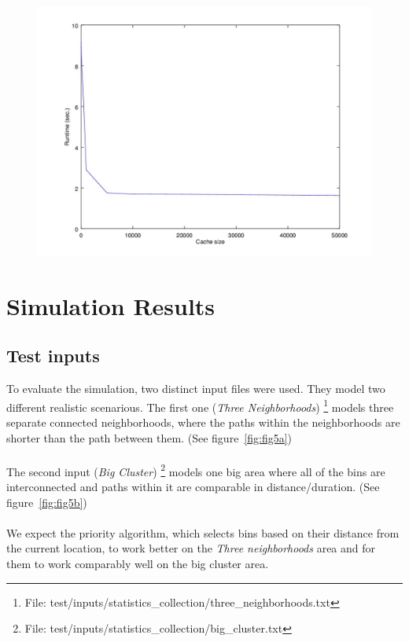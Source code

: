 \documentclass{article}
\begin{document}
			\begin{figure}[H]
			\centering
				\includegraphics[width=.55\columnwidth]{resources/cache_size.jpg}
				\label{fig:fig4}
			\end{figure}
			

	\section{Simulation Results}

		\subsection{Test inputs}
			To evaluate the simulation, two distinct input files were used. They model two different realistic scenarious.
			The first one (\textit{Three Neighborhoods}) \footnote{File: test/inputs/statistics\_collection/three\_neighborhoods.txt} models three separate connected neighborhoods, where the paths
			within the neighborhoods are shorter than the path between them. (See figure~\ref{fig:fig5a}) 
			\\
			\\
			The second input (\textit{Big Cluster}) \footnote{File: test/inputs/statistics\_collection/big\_cluster.txt} models one big area where all of the bins are interconnected and paths
			within it are comparable in distance/duration. (See figure~\ref{fig:fig5b})
			\\
			\\
			We expect the priority algorithm, which selects bins based on their distance from the current location, to work
			better on the \textit{Three neighborhoods} area and for them to work comparably well on the big cluster area.
\end{document}
